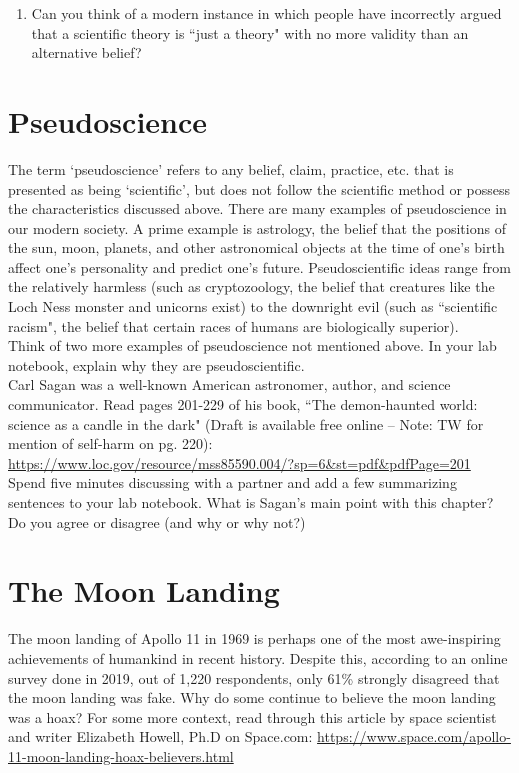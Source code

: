 \documentclass[12pt]{article}
\begin{document}
\begin{enumerate}
\item Can you think of a modern instance in which people have incorrectly argued that a scientific theory is ``just a theory" with no more validity than an alternative belief?
\end{enumerate} 

\section{Pseudoscience}
The term `pseudoscience' refers to any belief, claim, practice, etc. that is presented as being `scientific', but does not follow the scientific method or possess the characteristics discussed above. There are many examples of pseudoscience in our modern society. A prime example is astrology, the belief that the positions of the sun, moon, planets, and other astronomical objects at the time of one's birth affect one's personality and predict one's future. Pseudoscientific ideas range from the relatively harmless (such as cryptozoology, the belief that creatures like the Loch Ness monster and unicorns exist) to the downright evil (such as ``scientific racism", the belief that certain races of humans are biologically superior). \\

\noindent Think of two more examples of pseudoscience not mentioned above. In your lab notebook, explain why they are pseudoscientific. \\

\noindent Carl Sagan was a well-known American astronomer, author, and science communicator.  Read pages 201-229 of his book, ``The demon-haunted world: science as a candle in the dark" (Draft is available free online -- Note: TW for mention of self-harm on pg. 220): \\
\url{https://www.loc.gov/resource/mss85590.004/?sp=6&st=pdf&pdfPage=201} \\

\noindent Spend five minutes discussing with a partner and add a few summarizing sentences to your lab notebook. What is Sagan's main point with this chapter? Do you agree or disagree (and why or why not?) \\

\section{The Moon Landing}

The moon landing of Apollo 11 in 1969 is perhaps one of the most awe-inspiring achievements of humankind in recent history. Despite this, according to an online survey done in 2019, out of 1,220 respondents, only 61\% strongly disagreed that the moon landing was fake. Why do some continue to believe the moon landing was a hoax? For some more context, read through this article by space scientist and writer Elizabeth Howell, Ph.D on Space.com: \url{https://www.space.com/apollo-11-moon-landing-hoax-believers.html}\\
\end{document}
